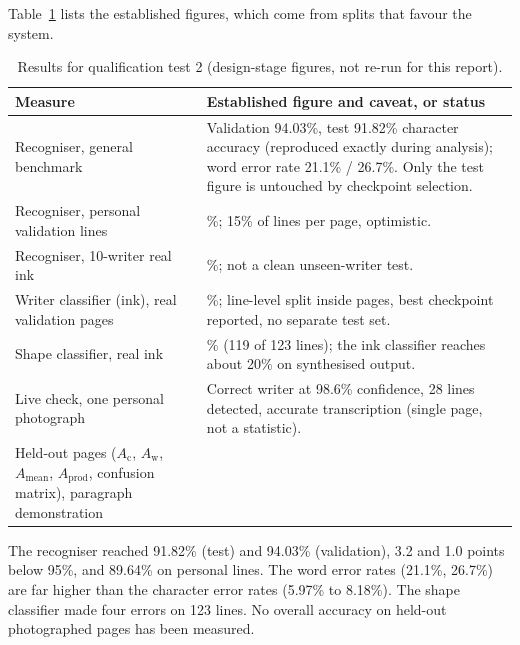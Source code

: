 
            Table~\ref{tab:res-r2} lists the established figures, which come from splits that favour the system.

\begin{table}[h]
\centering
\fontsize{10}{12}\selectfont
\begin{tabularx}{\linewidth}{|>{\raggedright\arraybackslash}p{4.3cm}|>{\raggedright\arraybackslash}X|}
\hline
\textbf{Measure} & \textbf{Established figure and caveat, or status} \\
\hline
Recogniser, general benchmark & Validation 94.03\%, test 91.82\% character accuracy (reproduced exactly during analysis); word error rate 21.1\% / 26.7\%. Only the test figure is untouched by checkpoint selection. \\
\hline
Recogniser, personal validation lines & 89.64\%; 15\% of lines per page, optimistic. \\
\hline
Recogniser, 10-writer real ink & 89.4\%; not a clean unseen-writer test. \\
\hline
Writer classifier (ink), real validation pages & 100\%; line-level split inside pages, best checkpoint reported, no separate test set. \\
\hline
Shape classifier, real ink & 96.7\% (119 of 123 lines); the ink classifier reaches about 20\% on synthesised output. \\
\hline
Live check, one personal photograph & Correct writer at 98.6\% confidence, 28 lines detected, accurate transcription (single page, not a statistic). \\
\hline
Held-out pages ($A_{\mathrm{c}}$, $A_{\mathrm{w}}$, $A_{\mathrm{mean}}$, $A_{\mathrm{prod}}$, confusion matrix), paragraph demonstration & \nym{} \\
\hline
\end{tabularx}
\caption{Results for qualification test 2 (design-stage figures, not re-run for this report).}
\label{tab:res-r2}
\end{table}


            The recogniser reached 91.82\% (test) and 94.03\% (validation), 3.2 and 1.0 points below 95\%, and 89.64\% on personal lines.
            The word error rates (21.1\%, 26.7\%) are far higher than the character error rates (5.97\% to 8.18\%).
            The shape classifier made four errors on 123 lines.
            No overall accuracy on held-out photographed pages has been measured.

